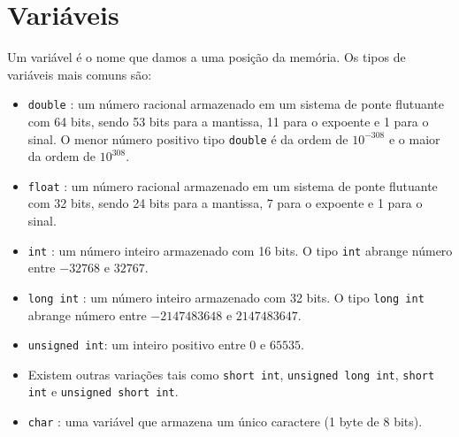 \section{Variáveis}
Um variável é o nome que damos a uma posição da memória. Os tipos de variáveis mais comuns são:
\begin{itemize}
 \item \verb|double| : um número racional armazenado em um sistema de ponte flutuante com 64 bits, sendo 53 bits para a mantissa, 11 para o expoente e 1 para o sinal. O menor número positivo tipo \verb|double| é da ordem de $10^{-308}$ e o maior da ordem de $10^{308}$.
 \item \verb|float| : um número racional armazenado em um sistema de ponte flutuante com 32 bits, sendo 24 bits para a mantissa, 7 para o expoente e 1 para o sinal. 
 \item \verb|int| : um número inteiro armazenado com 16 bits. O tipo \verb|int| abrange número entre $-32768$ e $32767$.
\item \verb|long int| : um número inteiro armazenado com 32 bits. O tipo \verb|long int| abrange número entre $-2147483648$ e $2147483647$.
\item \verb|unsigned int|: um inteiro positivo entre $0$ e $65535$.
\item Existem outras variações tais como \verb|short int|, \verb|unsigned long int|, \verb|short int| e \verb|unsigned short int|.
 \item \verb|char| : uma variável que armazena um único caractere (1 byte de 8 bits).
\end{itemize}

